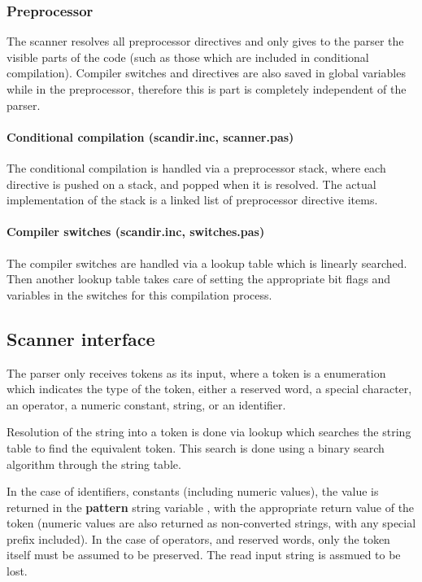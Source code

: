 \documentclass [a4paper,12pt]{article}
\begin{document}
\subsubsection{Preprocessor}
\label{subsubsec:preprocessorhook}

The scanner resolves all preprocessor directives and only gives to the
parser the visible parts of the code (such as those which are included in
conditional compilation). Compiler switches and directives are also saved in
global variables while in the preprocessor, therefore this is part is
completely independent of the parser.

\paragraph{Conditional compilation (scandir.inc, scanner.pas)}

The conditional compilation is handled via a preprocessor stack, where each
directive is pushed on a stack, and popped when it is resolved. The actual
implementation of the stack is a linked list of preprocessor directive
items.

\paragraph{Compiler switches (scandir.inc, switches.pas)}

The compiler switches are handled via a lookup table which is linearly
searched. Then another lookup table takes care of setting the appropriate
bit flags and variables in the switches for this compilation process.

\subsection{Scanner interface}
\label{subsec:scanner}

The parser only receives tokens as its input, where a token is a enumeration
which indicates the type of the token, either a reserved word, a special
character, an operator, a numeric constant, string, or an identifier.

Resolution of the string into a token is done via lookup which searches the
string table to find the equivalent token. This search is done using a
binary search algorithm through the string table.

In the case of identifiers, constants (including numeric values), the value
is returned in the \textbf{pattern} string variable , with the appropriate
return value of the token (numeric values are also returned as non-converted
strings, with any special prefix included). In the case of operators, and
reserved words, only the token itself must be assumed to be preserved. The
read input string is assmued to be lost.
\end{document}
